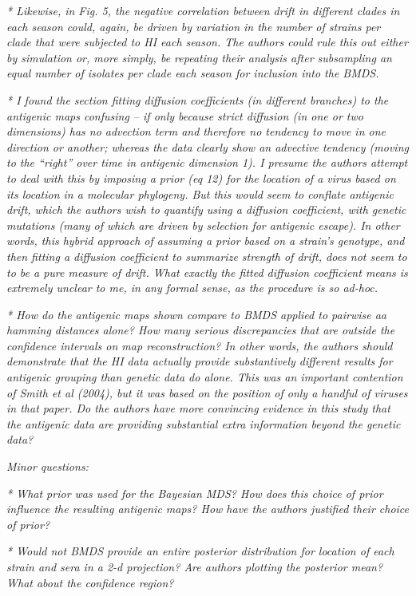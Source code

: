 \documentclass[11pt,oneside,letterpaper]{article}
\begin{document}
\textsl{* Likewise, in Fig. 5, the negative correlation between drift in different clades in each season could, again, be driven by variation in the number of strains per clade that were subjected to HI each season. The authors could rule this out either by simulation or, more simply, be repeating their analysis after subsampling an equal number of isolates per clade each season for inclusion into the BMDS.}

\textsl{* I found the section fitting diffusion coefficients (in different branches) to the antigenic maps confusing -- if only because strict diffusion (in one or two dimensions) has no advection term and therefore no tendency to move in one direction or another; whereas the data clearly show an advective tendency (moving to the ``right'' over time in antigenic dimension 1). I presume the authors attempt to deal with this by imposing a prior (eq 12) for the location of a virus based on its location in a molecular phylogeny. But this would seem to conflate antigenic drift, which the authors wish to quantify using a diffusion coefficient, with genetic mutations (many of which are driven by selection for antigenic escape). In other words, this hybrid approach of assuming a prior based on a strain's genotype, and then fitting a diffusion coefficient to summarize strength of drift, does not seem to to be a pure measure of drift. What exactly the fitted diffusion coefficient means is extremely unclear to me, in any formal sense, as the procedure is so ad-hoc.}

\textsl{* How do the antigenic maps shown compare to BMDS applied to pairwise aa hamming distances alone? How many serious discrepancies that are outside the confidence intervals on map reconstruction? In other words, the authors should demonstrate that the HI data actually provide substantively different results for antigenic grouping than genetic data do alone. This was an important contention of Smith et al (2004), but it was based on the position of only a handful of viruses in that paper. Do the authors have more convincing evidence in this study that the antigenic data are providing substantial extra information beyond the genetic data?}

\textsl{Minor questions:}

\textsl{* What prior was used for the Bayesian MDS? How does this choice of prior influence the resulting antigenic maps? How have the authors justified their choice of prior?}

\textsl{* Would not BMDS provide an entire posterior distribution for location of each strain and sera in a 2-d projection? Are authors plotting the posterior mean? What about the confidence region?}
\end{document}
